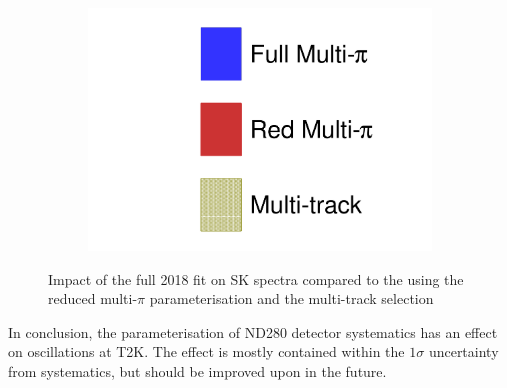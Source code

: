 \begin{figure}[h]
\begin{subfigure}[t]{0.32\textwidth}
		\includegraphics[width=\textwidth, trim={0mm 0mm 0mm 0mm}, clip, page=4]{figures/mach3/2018/data/2018_results_test_spectra_2018_results_test_redcov_spectra_2018_results_test_multitrack_spectra}
	\end{subfigure}
	
	\caption{Impact of the full 2018 fit on SK spectra compared to the using the reduced multi-$\pi$ parameterisation and the multi-track selection}
	\label{fig:sk_2018_nd280param}
\end{figure}

In conclusion, the parameterisation of ND280 detector systematics has an effect on oscillations at T2K. The effect is mostly contained within the $1\sigma$ uncertainty from systematics, but should be improved upon in the future.
